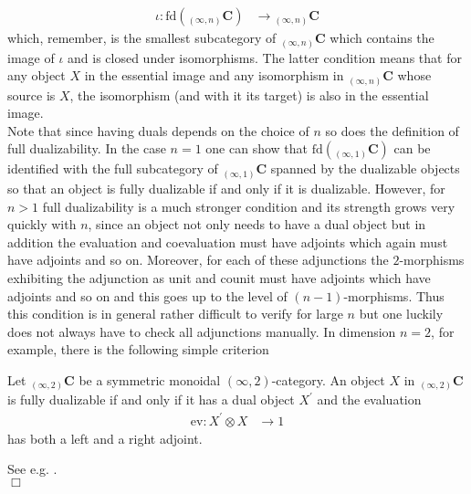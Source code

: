 \begin{align*}
  \iota
  \colon
  \textrm{fd}
  \left(
    {_{(\infty,n)}}\mathbf{C}
  \right)
  &\to
  {_{(\infty,n)}}\mathbf{C}
\end{align*}
which, remember, is the smallest subcategory of ${_{(\infty,n)}}\mathbf{C}$ which contains the image of $\iota$ and is closed under isomorphisms. The latter condition means that for any object $X$ in the essential image and any isomorphism in ${_{(\infty,n)}}\mathbf{C}$ whose source is $X$, the isomorphism (and with it its target) is also in the essential image.
\\
Note that since having duals depends on the choice of $n$ so does the definition of full dualizability. In the case $n = 1$ one can show that $\textrm{fd}({_{(\infty,1)}}\mathbf{C})$ can be identified with the full subcategory of ${_{(\infty,1)}}\mathbf{C}$ spanned by the dualizable objects so that an object is fully dualizable if and only if it is dualizable. However, for $n > 1$ full dualizability is a much stronger condition and its strength grows very quickly with $n$, since an object not only needs to have a dual object but in addition the evaluation and coevaluation must have adjoints which again must have adjoints and so on. Moreover, for each of these adjunctions the $2$-morphisms exhibiting the adjunction as unit and counit must have adjoints which have adjoints and so on and this goes up to the level of $(n-1)$-morphisms. Thus this condition is in general rather difficult to verify for large $n$ but one luckily does not always have to check all adjunctions manually. In dimension $n = 2$, for example, there is the following simple criterion
\\
\begin{lem}
\label{lem:2dimfd}
Let ${_{(\infty,2)}}\mathbf{C}$ be a symmetric monoidal $(\infty,2)$-category. An object $X$ in ${_{(\infty,2)}}\mathbf{C}$ is fully dualizable if and only if it has a dual object $X^{\prime}$ and the evaluation
\begin{align*}
  \mathrm{ev}
  \colon
  X^{\prime}
  \otimes
  X
  &\to
  1
\end{align*}
has both a left and a right adjoint.
\end{lem}
\begin{prf}
See e.g. \cite{dfcdc48c}.
\\
\phantom{proven}
\hfill
$\Box$
\end{prf}
